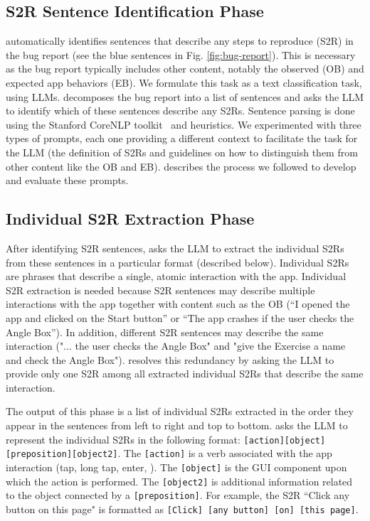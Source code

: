 \subsection{S2R Sentence Identification Phase}
\label{sec:identification-phase}

\tool automatically identifies sentences that describe any steps to reproduce (S2R) in the bug report (see the blue sentences in Fig. \ref{fig:bug-report}). 
This is necessary as the bug report typically includes other content, notably the observed (OB) and expected app behaviors (EB). 
We formulate this task as a text classification task, using LLMs. 
\tool decomposes the bug report into a list of sentences and asks the LLM to identify which of these sentences describe any S2Rs. 
Sentence parsing is done using the Stanford CoreNLP toolkit~\cite{manning2014stanford} and heuristics. 
We experimented with three types of prompts, each one providing a different context to facilitate the task for the LLM (\eg the definition of S2Rs and guidelines on how to distinguish them from other content like the OB and EB). 
 describes the process we followed to develop and evaluate these prompts.



\subsection{Individual S2R Extraction Phase}
\label{sec:indiv-s2rs-approach}

After identifying S2R sentences, \tool asks the LLM to extract the individual S2Rs from these sentences in a particular format (described below). 
Individual S2Rs are phrases that describe a single, atomic interaction with the app. 
Individual S2R extraction is needed because S2R sentences may describe multiple interactions with the app together with content such as the OB (\eg ``I opened the app and clicked on the Start button'' or ``The app crashes if the user checks the Angle Box''). 
In addition, different S2R sentences may describe the same interaction (\eg "... the user checks the Angle Box" and "give the Exercise a name and check the Angle Box"). 
\tool resolves this redundancy by asking the LLM to provide only one S2R among all extracted individual S2Rs that describe the same interaction.

The output of this phase is a list of individual S2Rs extracted in the order they appear in the sentences from left to right and top to bottom. 
\tool asks the LLM to represent the individual S2Rs in the following format: 
\texttt{\small[action][object][preposition][object2]}. 
The \texttt{\small[action]} is a verb associated with the app interaction (tap, long tap, enter, \etc). 
The \texttt{\small[object]} is the GUI component upon which the action is performed. 
The \texttt{\small[object2]} is additional information related to the object connected by a \texttt{\small[preposition]}. 
For example, the S2R ``Click any button on this page" is formatted as \texttt{\small[Click] [any button] [on] [this page]}.

